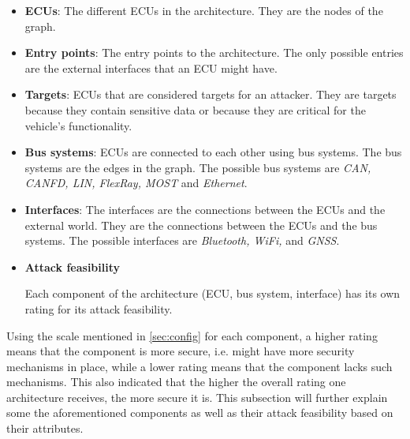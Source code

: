 \begin{itemize}

    \item \textbf{ECUs}: The different ECUs in the architecture. They are the nodes of the graph.
    
    \item \textbf{Entry points}: The entry points to the architecture. The only possible entries are the external interfaces that an ECU might have.
    
    \item \textbf{Targets}: ECUs that are considered targets for an attacker. They are targets because they contain sensitive data or because they are critical for the vehicle's functionality.
    
    \item \textbf{Bus systems}: ECUs are connected to each other using bus systems. The bus systems are the edges in the graph. The possible bus systems are \textit{CAN, CANFD, LIN, FlexRay, MOST} and \textit{Ethernet}.
    
    \item \textbf{Interfaces}: The interfaces are the connections between the ECUs and the external world. They are the connections between the ECUs and the bus systems. The possible interfaces are \textit{Bluetooth, WiFi,} and \textit{GNSS}.
    
    \item \textbf{Attack feasibility}
    
    Each component of the architecture (ECU, bus system, interface) has its own rating for its attack feasibility.

\end{itemize}

Using the scale mentioned in \ref{sec:config} for each component, a higher rating means that the component is more secure, i.e. might have more security mechanisms in place,
while a lower rating means that the component lacks such mechanisms.
This also indicated that the higher the overall rating one architecture receives, the more secure it is.
This subsection will further explain some the aforementioned components as well as their attack feasibility based on their attributes.

